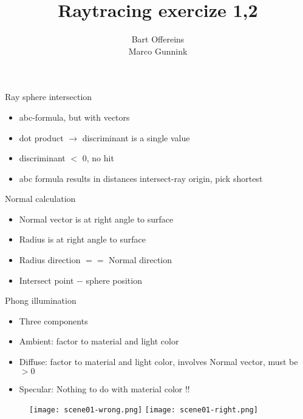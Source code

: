 \documentclass{beamer}
\author{Bart Offereins\\Marco Gunnink}
\title{Raytracing exercize 1,2}
\begin{document}
\titlepage

\begin{frame}{Ray sphere intersection}

\begin{itemize}
  \item abc-formula, but with vectors
  \item dot product $\rightarrow$ discriminant is a single value
  \item discriminant $<$ 0, no hit
  \item abc formula results in distances intersect-ray origin, pick shortest
\end{itemize}

\end{frame}

\begin{frame}{Normal calculation}

\begin{itemize}
  \item Normal vector is at right angle to surface
  \item Radius is at right angle to surface
  \item Radius direction $==$ Normal direction 
  \item Intersect point $-$ sphere position
\end{itemize}

\end{frame}

\begin{frame}{Phong illumination}

\begin{itemize}
  \item Three components
  \item Ambient: factor to material and light color
  \item Diffuse: factor to material and light color, involves Normal vector, must be $> 0$
  \item Specular: Nothing to do with material color !!
\end{itemize}

   \begin{figure}[ht]
       \texttt{[image: scene01-wrong.png]} %
       \texttt{[image: scene01-right.png]} %
    \end{figure}

\end{frame}
\end{document}
